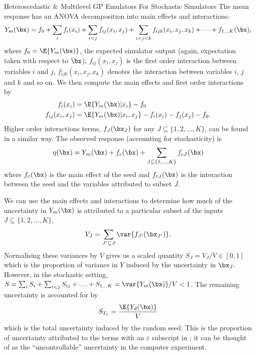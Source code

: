 \begin{chapter}{Heteroscedastic \& Multilevel GP Emulators For Stochastic Simulators\label{Ch:Hetsml}}
The mean response has an ANOVA decomposition into main effects and interactions:
\begin{equation*}
Y_m(\bx) = f_0 + \sum_i f_i(x_i) + \sum_{i<j} f_{ij}(x_i, x_j) + \sum_{i<j<k} f_{ijk}(x_i, x_j, x_k) + \cdots + f_{1\ldots K} (\bx),
\end{equation*}
where $f_0 = \E \{ Y_m(\bx)\} $, the expected simulator output (again, expectation taken with respect to $\bx$), $f_{ij}(x_i, x_j)$ is the first order interaction between variables $i$ and $j$, $f_{ijk}(x_i, x_j, x_k)$ denotes the interaction between variables $i$, $j$ and $k$ and so on. We then compute the main effects and first order interactions by
\begin{align*}
f_i(x_i) &= \E \{ Y_m(\bx) | x_i \} - f_0\\
f_{ij}(x_i, x_j) &= \E \{ Y_m(\bx) | x_i, x_j \} - f_i(x_i) - f_j(x_j) -f_0.\label{Eq:interact}
\end{align*}
Higher order interactions terms, $f_J(\bx_J)$ for any $J \subseteq \{1, 2, \ldots, K \}$,  can be found in a similar way.
The observed response (accounting for stochasticity) is
\begin{equation}
\eta(\bx) = Y_m(\bx) + f_{\varepsilon}(\bx) + \sum_{  J  \subseteq \{1, \ldots , K\} } f_{ \varepsilon J}(\bx) \label{Eq:observed}
\end{equation}
where $f_\varepsilon (\bx)$ is the main effect of the seed and $f_{\varepsilon J}(\bx)$ is the interaction between the seed and the variables attributed to subset $J$.

We can use the main effects and interactions to determine how much of the uncertainty in $Y_m(\bx)$ is attributed to a particular subset of the inputs $J \subseteq \{1, 2, \ldots, K\} $,
\begin{equation*}
	V_J = \sum_{J' \subseteq J} \var \{ f_{J'} (\bx_{J'}) \}.
\end{equation*}
Normalising these variances by $V$ gives us a scaled quantity $S_J = V_J / V \in [0,1]$ which is the proportion of variance in $Y$ induced by the uncertainty in $\bx_J$. However, in the stochastic setting, $S = \sum_{i} S_i + \sum_{i<j} S_{ij} + \ldots + S_{1\ldots K}  =\var \{ Y_m(\bx)\} / V  < 1$. The remaining uncertainty is accounted for by
\begin{equation*}
S_{T_\varepsilon} = \frac{ \E \{Y_d(\bx)\} } {V}
\end{equation*}
which is the total uncertainty induced by the random seed. This is the proportion of uncertainty attributed to the terms with an $\varepsilon$ subscript in ; it can be thought of as the ``uncontrollable'' uncertainty in the computer experiment.


\end{chapter}
